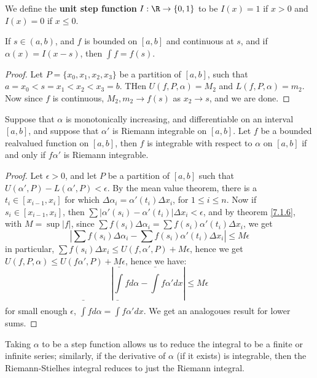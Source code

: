 \begin{definition}
    We define the \textbf{unit step function} $I: \R \rightarrow \{0,1\}$ to be
    $I(x)=1$ if  $x>0$ and  $I(x)=0$ if  $x \leq 0$.
\end{definition}

\begin{theorem}\label{7.2.3}
    If $s \in (a,b)$, and $f$ is bounded on  $[a,b]$ and continuous at $s$, and
    if $\alpha(x)=I(x-s)$, then  $\int{f}=f(s)$.
\end{theorem}
\begin{proof}
    Let $P=\{x_0,x_1,x_2,x_3\}$ be a partition of $[a,b]$, such that
    $a=x_0<s=x_1<x_2<x_3=b$. THen $U(f,P,\alpha)=M_2$ and  $L(f,P,\alpha)=m_2$.
    Now since $f$ is continuous, $ M_2,m_2 \rightarrow f(s)$ as $ x_2
    \rightarrow s$, and we are done.
\end{proof}


\begin{theorem}\label{7.2.5}
    Suppose that $\alpha$ is monotonically increasing, and differentiable on an
    interval $[a,b]$, and suppose that  $\alpha'$ is Riemann integrable on
    $[a,b]$. Let $f$ be a bounded realvalued function on  $[a,b]$, then  $f$ is
    integrable with respect to  $\alpha$ on  $[a,b]$ if and only if  $f\alpha'$
    is Riemann integrable.
\end{theorem}
\begin{proof}
    Let $\epsilon>0$, and let  $P$ be a partition of  $[a,b]$ such that
    $U(\alpha',P)-L(\alpha',P)<\epsilon$. By the mean value theorem, there is a
    $t_i \in [x_{i-1},x_i]$ for which $\Delta{\alpha_i}=\alpha'(t_i)
    \Delta{x_i}$, for $1 \leq i \leq n$. Now if $s_i \in [x_{i-1},x_i]$, then
    $\sum{|\alpha'(s_i)-\alpha'(t_i)| \Delta{x_i}}<\epsilon$, and by theorem
    \ref{7.1.6}, with  $M=\sup{|f|}$, since  $\sum{f(s_i)
    \Delta{\alpha_i}}=\sum{f(s_i)\alpha'(t_i) \Delta{x_i}}$, we get
        \begin{equation*}
            |\sum{f(s_i) \Delta{\alpha_i}}-\sum{f(s_i)\alpha'(t_i) \Delta{x_i}}|
            \leq M\epsilon
        \end{equation*} 
        in particular, $\sum{f(s_i) \Delta{x_i}} \leq U(f,\alpha',P)+M\epsilon$,
        hence we get  $U(f,P,\alpha) \leq U(f\alpha',P)+M\epsilon$, hence we
        have:
            \begin{equation*}
                |\bar{\int}{f} d\alpha-\bar{\int}{f\alpha'} dx| \leq M\epsilon		
            \end{equation*}
        for small enough $\epsilon$, $\bar{\int}{f} d\alpha=\bar{\int}{f\alpha'} dx$.
        We get an analogoues result for lower sums.
\end{proof}
\begin{remark}
    Taking $\alpha$ to be a step function allows us to reduce the integral to be
    a finite or infinite series; similarly, if the derivative of  $\alpha$  (if
    it exists) is integrable, then the Riemann-Stielhes integral reduces to just
    the Riemann integral.
\end{remark}

